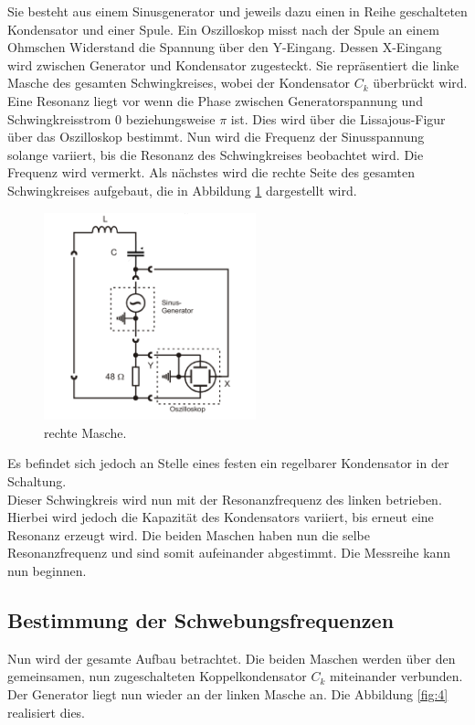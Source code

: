 Sie besteht aus einem Sinusgenerator und jeweils dazu einen in Reihe geschalteten Kondensator und einer Spule.
Ein Oszilloskop misst nach der Spule an einem Ohmschen Widerstand die Spannung über den Y-Eingang.
Dessen X-Eingang wird zwischen Generator und Kondensator zugesteckt.
Sie repräsentiert die linke Masche des gesamten Schwingkreises, wobei der Kondensator $C_k$ überbrückt wird.\\
Eine Resonanz liegt vor wenn die Phase zwischen Generatorspannung und Schwingkreisstrom 0 beziehungsweise $\pi$ ist.
Dies wird über die Lissajous-Figur über das Oszilloskop bestimmt.
Nun wird die Frequenz der Sinusspannung solange variiert, bis die Resonanz des Schwingkreises beobachtet wird.
Die Frequenz wird vermerkt.
Als nächstes wird die rechte Seite des gesamten Schwingkreises aufgebaut, die in Abbildung \ref{fig:3} dargestellt wird.

\begin{figure}[H]
  \centering
  \includegraphics[height=6cm]{just2.png}
  \caption{rechte Masche.}
  \label{fig:3}
\end{figure}

Es befindet sich jedoch an Stelle eines festen ein regelbarer Kondensator in der Schaltung.\\
Dieser Schwingkreis wird nun mit der Resonanzfrequenz des linken betrieben.
Hierbei wird jedoch die Kapazität des Kondensators variiert, bis erneut eine Resonanz erzeugt wird.
Die beiden Maschen haben nun die selbe Resonanzfrequenz und sind somit aufeinander abgestimmt.
Die Messreihe kann nun beginnen.\\
\subsection{Bestimmung der Schwebungsfrequenzen}
\label{sec:d1}
Nun wird der gesamte Aufbau betrachtet.
Die beiden Maschen werden über den gemeinsamen, nun zugeschalteten Koppelkondensator $C_k$ miteinander verbunden.
Der Generator liegt nun wieder an der linken Masche an.
Die Abbildung \ref{fig:4} realisiert dies.

